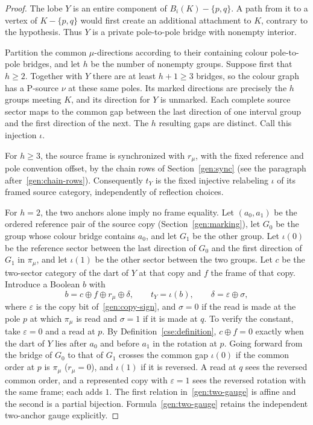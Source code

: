 \begin{proof}
The lobe $Y$ is an entire component of $B_i(K)-\{p,q\}$.  A path from
it to a vertex of $K-\{p,q\}$ would first create an additional attachment
to $K$, contrary to the hypothesis.  Thus $Y$ is a private pole-to-pole
bridge with nonempty interior.

Partition the common $\mu$-directions according to their containing
colour pole-to-pole bridges, and let $h$ be the number of nonempty groups.
Suppose first that $h\geq 2$.  Together with $Y$ there are at least
$h+1\geq 3$ bridges, so the colour graph has a P-source $\nu$ at these
same poles.  Its marked directions are precisely the $h$ groups meeting
$K$, and its direction for $Y$ is unmarked.  Each complete source sector
maps to the common gap between the last direction of one interval group
and the first direction of the next.  The $h$ resulting gaps are distinct.
Call this injection $\iota$.

For $h\geq 3$, the source frame is synchronized with $r_\mu$, with the
fixed reference and pole convention offset, by the chain rows of
Section~\ref{gen:sync} (see the paragraph after~\eqref{gen:chain-rows}).
Consequently $t_Y$ is the fixed injective relabeling $\iota$ of its framed
source category, independently of reflection choices.

For $h=2$, the two anchors alone imply no frame equality.  Let
$(a_0,a_1)$ be the ordered reference pair of the source copy
(Section~\ref{gen:marking}), let $G_0$ be the group whose colour bridge
contains $a_0$, and let $G_1$ be the other group.  Let $\iota(0)$ be the
reference sector between the last direction of $G_0$ and the first
direction of $G_1$ in $\pi_\mu$, and let $\iota(1)$ be the other sector
between the two groups.  Let $c$ be the two-sector category of the
dart of $Y$ at that copy and $f$ the frame of that copy.  Introduce a Boolean $b$
with
\begin{equation}
 b=c\oplus f\oplus r_\mu\oplus\delta,
 \qquad t_Y=\iota(b),
 \qquad \delta=\varepsilon\oplus\sigma,
 \label{gen:two-gauge}
\end{equation}
where $\varepsilon$ is the copy bit of~\eqref{gen:copy-sign}, and
$\sigma=0$ if the read is made at the pole $p$ at which $\pi_\mu$ is read
and $\sigma=1$ if it is made at $q$.  To verify the constant, take
$\varepsilon=0$ and a read at $p$.  By Definition~\ref{cse:definition},
$c\oplus f=0$ exactly when the dart of $Y$ lies after $a_0$ and before
$a_1$ in the rotation at $p$.  Going forward from the bridge of $G_0$ to
that of $G_1$ crosses the common gap $\iota(0)$ if the common order at $p$
is $\pi_\mu$ ($r_\mu=0$), and $\iota(1)$ if it is reversed.  A read at $q$
sees the reversed common order, and a represented copy with
$\varepsilon=1$ sees the reversed rotation with the same frame; each adds
$1$.  The first relation in~\eqref{gen:two-gauge} is affine and the
second is a partial bijection.  Formula~\eqref{gen:two-gauge} retains the
independent two-anchor gauge explicitly.


\end{proof}
